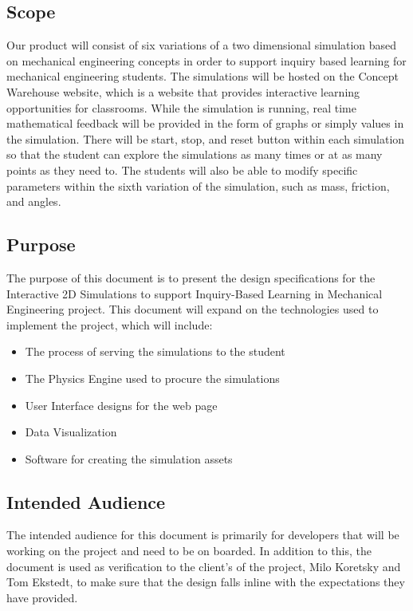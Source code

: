 \documentclass[onecolumn, draftclsnofoot,10pt, compsoc]{IEEEtran}
\begin{document}
\subsection{Scope}
Our product will consist of six variations of a two dimensional simulation based on mechanical engineering concepts in order to support inquiry based learning for mechanical engineering students. The simulations will be hosted on the Concept Warehouse website, which is a website that provides interactive learning opportunities for classrooms. While the simulation is running, real time mathematical feedback will be provided in the form of graphs or simply values in the simulation. There will be start, stop, and reset button within each simulation so that the student can explore the simulations as many times or at as many points as they need to. The students will also be able to modify specific parameters within the sixth variation of the simulation, such as mass, friction, and angles.

\subsection{Purpose}
The purpose of this document is to present the design specifications for the Interactive 2D Simulations to support Inquiry-Based Learning in Mechanical Engineering project. This document will expand on the technologies used to implement the project, which will include:

\begin{itemize}
  \item The process of serving the simulations to the student
  \item The Physics Engine used to procure the simulations
  \item User Interface designs for the web page
  \item Data Visualization
  \item Software for creating the simulation assets
\end{itemize} 

\subsection{Intended Audience}
The intended audience for this document is primarily for developers that will be working on the project and need to be on boarded. In addition to this, the document is used as verification to the client's of the project, Milo Koretsky and Tom Ekstedt, to make sure that the design falls inline with the expectations they have provided.
\end{document}
